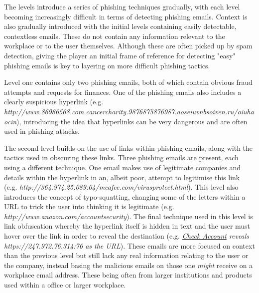 \documentclass{l4proj}
\begin{document}
The levels introduce a series of phishing techniques gradually, with each level becoming increasingly difficult in terms of detecting phishing emails. Context is also gradually introduced with the initial levels containing easily detectable, contextless emails. These do not contain any information relevant to the workplace or to the user themselves. Although these are often picked up by spam detection, giving the player an initial frame of reference for detecting "easy" phishing emails is key to layering on more difficult phishing tactics. 

Level one contains only two phishing emails, both of which contain obvious fraud attempts and requests for finances. One of the phishing emails also includes a clearly suspicious hyperlink (e.g. \textit{http://www.86986568.com.cancercharity.9876875876987.aoseiuvnbsoiven.ru/oiuhaocin}), introducing the idea that hyperlinks can be very dangerous and are often used in phishing attacks. 

The second level builds on the use of links within phishing emails, along with the tactics used in obscuring these links. Three phishing emails are present, each using a different technique. One email makes use of legitimate companies and details within the hyperlink in an, albeit poor, attempt to legitimise this link (e.g.  \textit{http://364.974.25.089:64/mcafee.com/virusprotect.html}). This level also introduces the concept of typo-squatting, changing some of the letters within a URL to trick the user into thinking it is legitimate (e.g. \textit{http://www.anazon.com/accountsecurity}). The final technique used in this level is link obfuscation whereby the hyperlink itself is hidden in text and the user must hover over the link in order to reveal the destination (e.g. \textit{\underline{Check Account} reveals https://247.972.76.314:76 as the URL}). These emails are more focused on context than the previous level but still lack any real information relating to the user or the company, instead basing the malicious emails on those one \emph{might} receive on a workplace email address. These being often from larger institutions and products used within a office or larger workplace.
\end{document}

